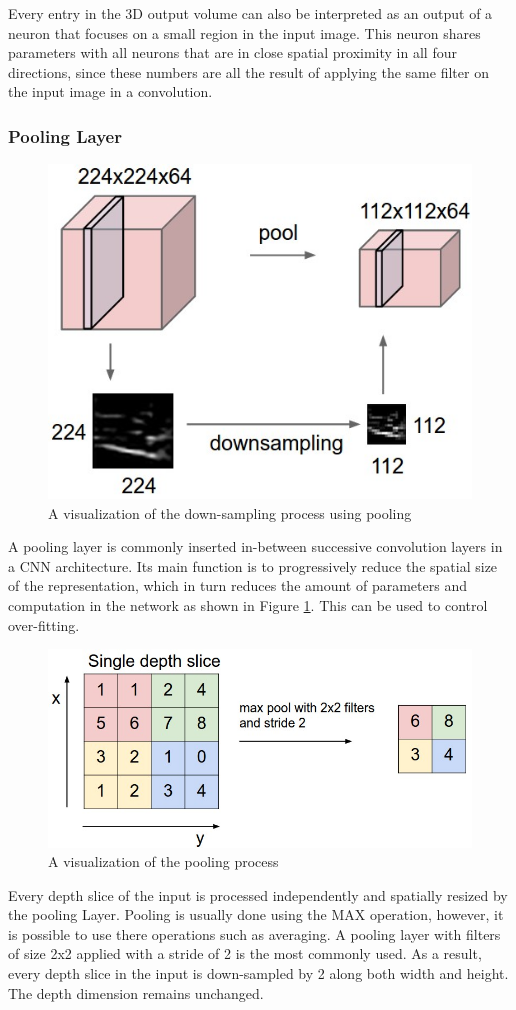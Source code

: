 Every entry in the 3D output volume can also be interpreted as an output of a neuron that focuses on a small region in the input image. This neuron shares parameters with all neurons that are in close spatial proximity in all four directions, since these numbers are all the result of applying the same filter on the input image in a convolution. 

\subsubsection{Pooling Layer}
\begin{figure}[ht]
\includegraphics[trim={0cm 0cm 0cm 0cm},clip,width=0.7\linewidth]{Figures/pool.jpeg}
\centering
\caption{A visualization of the down-sampling process using pooling}
\label{pool}
\end{figure}

A pooling layer is commonly inserted in-between successive convolution layers in a CNN architecture. Its main function is to progressively reduce the spatial size of the representation, which in turn reduces the amount of parameters and computation in the network as shown in Figure \ref{pool}. This can be used to control over-fitting. 

\begin{figure}[ht]
\includegraphics[trim={0cm 0cm 0cm 0cm},clip,width=\linewidth]{Figures/maxpool.jpeg}
\centering
\caption{A visualization of the pooling process}
\label{maxpool}
\end{figure}
Every depth slice of the input is processed independently and spatially resized by the pooling Layer. Pooling is usually done using the MAX operation, however, it is possible to use there operations such as averaging. A pooling layer with filters of size 2x2 applied with a stride of 2 is the most commonly used. As a result, every depth slice in the input is down-sampled by 2 along both width and height. The depth dimension remains unchanged.

